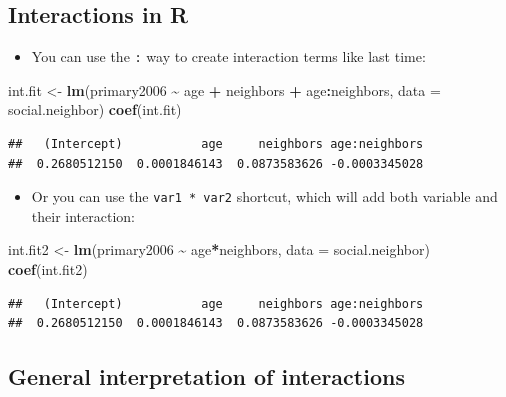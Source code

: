 \documentclass[
]{article}
\newenvironment{Shaded}{\begin{snugshade}}{\end{snugshade}}
\newcommand{\AttributeTok}[1]{\textcolor[rgb]{0.13,0.29,0.53}{#1}}
\newcommand{\FunctionTok}[1]{\textcolor[rgb]{0.13,0.29,0.53}{\textbf{#1}}}
\newcommand{\NormalTok}[1]{#1}
\newcommand{\OtherTok}[1]{\textcolor[rgb]{0.56,0.35,0.01}{#1}}
\newcommand{\SpecialCharTok}[1]{\textcolor[rgb]{0.81,0.36,0.00}{\textbf{#1}}}
\providecommand{\tightlist}{%
  \setlength{\itemsep}{0pt}\setlength{\parskip}{0pt}}
\begin{document}
\subsection{Interactions in R}\label{interactions-in-r}

\begin{itemize}
\tightlist
\item
  You can use the \texttt{:} way to create interaction terms like last
  time:
\end{itemize}

\begin{Shaded}
\begin{Highlighting}[]
\NormalTok{int.fit }\OtherTok{\textless{}{-}} \FunctionTok{lm}\NormalTok{(primary2006 }\SpecialCharTok{\textasciitilde{}}\NormalTok{ age }\SpecialCharTok{+}\NormalTok{ neighbors }\SpecialCharTok{+}\NormalTok{ age}\SpecialCharTok{:}\NormalTok{neighbors, }\AttributeTok{data =}\NormalTok{ social.neighbor)}
\FunctionTok{coef}\NormalTok{(int.fit)}
\end{Highlighting}
\end{Shaded}

\begin{verbatim}
##   (Intercept)           age     neighbors age:neighbors 
##  0.2680512150  0.0001846143  0.0873583626 -0.0003345028
\end{verbatim}

\begin{itemize}
\tightlist
\item
  Or you can use the \texttt{var1\ *\ var2} shortcut, which will add
  both variable and their interaction:
\end{itemize}

\begin{Shaded}
\begin{Highlighting}[]
\NormalTok{int.fit2 }\OtherTok{\textless{}{-}} \FunctionTok{lm}\NormalTok{(primary2006 }\SpecialCharTok{\textasciitilde{}}\NormalTok{ age}\SpecialCharTok{*}\NormalTok{neighbors, }\AttributeTok{data =}\NormalTok{ social.neighbor)}
\FunctionTok{coef}\NormalTok{(int.fit2)}
\end{Highlighting}
\end{Shaded}

\begin{verbatim}
##   (Intercept)           age     neighbors age:neighbors 
##  0.2680512150  0.0001846143  0.0873583626 -0.0003345028
\end{verbatim}

\subsection{General interpretation of
interactions}\label{general-interpretation-of-interactions}
\end{document}
